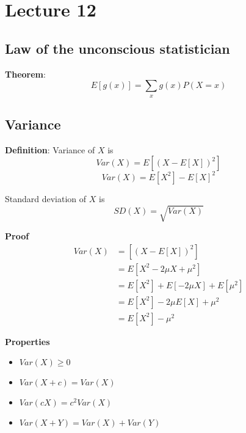 \chapter{Lecture 12}

\section{Law of the unconscious statistician}

\begin{framed}
   \textbf{Theorem}:
   \[
      E[g(x)] = \sum_{x} g(x) P(X = x)
   \] 
\end{framed}

\section{Variance}
\begin{framed}
   \textbf{Definition}: Variance of $X$ is 
   \[
      Var(X) = E \left[ \left( X - E[X] \right)^2 \right]
   \] 
   \[
      Var(X) = E [ X^2] - E[X]^2
   \] 

   Standard deviation of $X$ is
   \[
     SD(X) = \sqrt{Var(X)}
   \] 

   \textbf{Proof}
   \begin{align*}
      Var(X) &=  \left[ \left( X - E[X] \right)^2 \right] \\
             &= E[X^2 - 2 \mu X + \mu^2] \\
             &= E[X^2] + E[-2\mu X] +  E[\mu^2]\\
             &= E[X^2] - 2\mu E[X] + \mu^2 \\
             &= E[X^2] - \mu^2
   \end{align*}

   \textbf{Properties}
   \begin{itemize}
      \item $Var(X) \geq 0$
      \item $Var(X + c) = Var(X)$
      \item $Var(cX ) = c^2Var(X)$
      \item $Var(X +Y) = Var(X) + Var(Y)$
   \end{itemize}
\end{framed}

